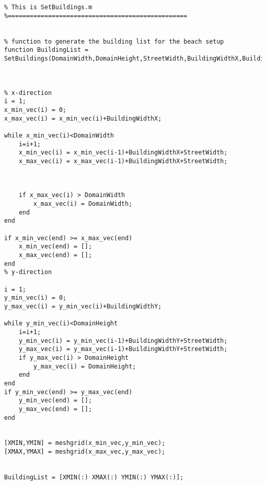 \lstset{basicstyle=\footnotesize\ttfamily}
    
\begin{lstlisting}[breaklines]
%=================================================
% This is SetBuildings.m
%=================================================


% function to generate the building list for the beach setup
function BuildingList = SetBuildings(DomainWidth,DomainHeight,StreetWidth,BuildingWidthX,BuildingWidthY)



% x-direction
i = 1;
x_min_vec(i) = 0;
x_max_vec(i) = x_min_vec(i)+BuildingWidthX;

while x_min_vec(i)<DomainWidth
    i=i+1;
    x_min_vec(i) = x_min_vec(i-1)+BuildingWidthX+StreetWidth;
    x_max_vec(i) = x_max_vec(i-1)+BuildingWidthX+StreetWidth;
    
    
    
    if x_max_vec(i) > DomainWidth
        x_max_vec(i) = DomainWidth;
    end
end

if x_min_vec(end) >= x_max_vec(end)
    x_min_vec(end) = [];
    x_max_vec(end) = [];
end
% y-direction

i = 1;
y_min_vec(i) = 0;
y_max_vec(i) = y_min_vec(i)+BuildingWidthY;

while y_min_vec(i)<DomainHeight
    i=i+1;
    y_min_vec(i) = y_min_vec(i-1)+BuildingWidthY+StreetWidth;
    y_max_vec(i) = y_max_vec(i-1)+BuildingWidthY+StreetWidth;
    if y_max_vec(i) > DomainHeight
        y_max_vec(i) = DomainHeight;
    end
end
if y_min_vec(end) >= y_max_vec(end) 
    y_min_vec(end) = [];
    y_max_vec(end) = [];
end


[XMIN,YMIN] = meshgrid(x_min_vec,y_min_vec);
[XMAX,YMAX] = meshgrid(x_max_vec,y_max_vec);


BuildingList = [XMIN(:) XMAX(:) YMIN(:) YMAX(:)];

\end{lstlisting}